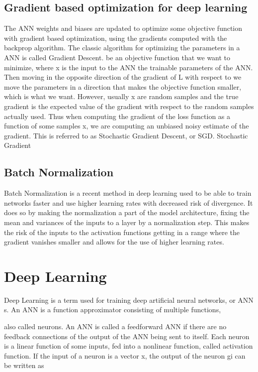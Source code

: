 \subsection{Gradient based optimization for deep learning}

The ANN weights and biases are updated to optimize some objective function
with gradient based optimization, using the gradients computed with the backprop algorithm.
The classic algorithm for optimizing the parameters in a ANN is called Gradient
Descent. be an objective function that we want to minimize, where
x is the input to the ANN the trainable parameters of the ANN. Then
moving in the opposite direction of the gradient of L with respect to  we move
the parameters in a direction that makes the objective function smaller, which is
what we want. However, usually x are random samples and the true gradient is
the expected value of the gradient with respect to the random samples actually
used. Thus when computing the gradient of the loss function as a function of
some samples x, we are computing an unbiased noisy estimate of the gradient.
This is referred to as Stochastic Gradient Descent, or SGD. Stochastic Gradient

\subsection{Batch Normalization}
Batch Normalization is a recent method in deep learning used to be able to train
networks faster and use higher learning rates with decreased risk of divergence.
It does so by making the normalization a part of the model architecture, fixing
the mean and variances of the inputs to a layer by a normalization step. This
makes the risk of the inputs to the activation functions getting in a range where
the gradient vanishes smaller and allows for the use of higher learning rates. 

\section{Deep Learning}
Deep Learning is a term used for training deep artificial neural networks, or
ANN s. An ANN is a function approximator consisting of multiple functions,

also called neurons. An ANN is called a feedforward ANN if there are no
feedback connections of the output of the ANN being sent to itself. Each neuron
is a linear function of some inputs, fed into a nonlinear function, called activation
function. If the input of a neuron is a vector x, the output of the neuron gi can
be written as


